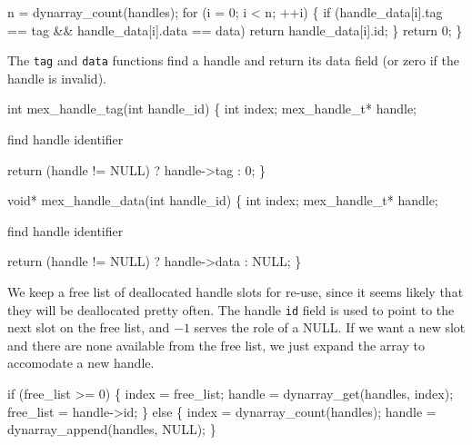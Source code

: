     n = dynarray_count(handles);
    for (i = 0; i < n; ++i) \{
        if (handle_data[i].tag == tag && handle_data[i].data == data)
            return handle_data[i].id;
    \}
    return 0;
\}

\nwendcode{}\nwdocspar

The {\tt{}tag} and {\tt{}data} functions find a handle and return its data
field (or zero if the handle is invalid).

\nwenddocs{}\plusendmoddef
int mex_handle_tag(int handle_id)
\{
    int index;
    mex_handle_t* handle;

    \LA{}find handle identifier~{\nwtagstyle{}}\RA{}

    return (handle != NULL) ? handle->tag : 0;
\}

\nwendcode{}\nwdocspar

\nwenddocs{}\plusendmoddef
void* mex_handle_data(int handle_id)
\{
    int index;
    mex_handle_t* handle;

    \LA{}find handle identifier~{\nwtagstyle{}}\RA{}

    return (handle != NULL) ? handle->data : NULL;
\}

\nwendcode{}\nwdocspar

We keep a free list of deallocated handle slots for re-use, since
it seems likely that they will be deallocated pretty often.
The handle {\tt{}id} field is used to point to the next slot on
the free list, and $-1$ serves the role of a NULL.  If we want
a new slot and there are none available from the free list, we
just expand the array to accomodate a new handle.

\nwenddocs{}\endmoddef
if (free_list >= 0) \{
    index      = free_list;
    handle     = dynarray_get(handles, index);
    free_list  = handle->id;
\} else \{
    index      = dynarray_count(handles);
    handle     = dynarray_append(handles, NULL);
\}

\nwendcode{}\nwdocspar


